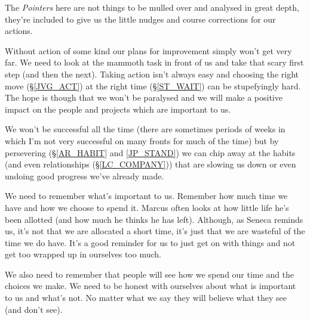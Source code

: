 \cleardoublepage
{\small

The \emph{Pointers} here are not things to be mulled over and analysed in great depth, they're included to give us the little nudges and course corrections for our actions.

Without action of some kind our plans for improvement simply won't get very far. We need to look at the mammoth task in front of us and take that scary first step (and then the next). 
Taking action isn't always easy and choosing the right move (\S \ref{JVG_ACT}) at the right time (\S \ref{ST_WAIT}) can be stupefyingly hard.
The hope is though that we won't be paralysed and we will make a positive impact on the people and projects which are important to us.

We won't be successful all the time (there are sometimes periods of weeks in which I'm not very successful on many fronts for much of the time) but by persevering (\S \ref{AR_HABIT} and \ref{JP_STAND}) we can chip away at the habits (and even relationships (\S \ref{LC_COMPANY})) that are slowing us down or even undoing good progress we've already made.

We need to remember what's important to us. Remember how much time we have and how we choose to spend it. Marcus often looks at how little life he's been allotted (and how much he thinks he has left). Although, as Seneca reminds us, it's not that we are allocated a short time, it's just that we are wasteful of the time we do have. It's a good reminder for us to just get on with things and not get too wrapped up in ourselves too much. 

We also need to remember that people will see how we spend our time and the choices we make. We need to be honest with ourselves about what is important to us and what's not. No matter what we say they will believe what they see (and don't see). 

}
